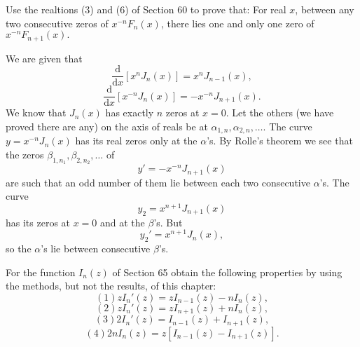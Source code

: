 \begin{problem} \label{problem13chapter6}
Use the realtions (3) and (6) of Section 60 to prove that: For real $x$, between any two consecutive zeros of $x^{-n}F_n(x)$, there lies one and only one zero of $x^{-n}F_{n+1}(x).$
\end{problem}
\begin{solution}
We are given that
$$\dfrac{\mathrm{d}}{\mathrm{d}x} \left[ x^n J_n(x) \right] = x^n J_{n-1}(x),$$
$$\dfrac{\mathrm{d}}{\mathrm{d}x} \left[ x^{-n} J_n(x) \right] = -x^{-n} J_{n+1}(x).$$
We know that $J_n(x)$ has exactly $n$ zeros at $x=0$. Let the others (we have proved there are any) on the axis of reals be at $\alpha_{1,n}, \alpha_{2,n}, \ldots.$ 
The curve $y = x^{-n}J_n(x)$ has its real zeros only at the $\alpha$'s. By Rolle's theorem we see that the zeros $\beta_{1,n_1}, \beta_{2,n_2}, \ldots$ of 
$$y' = -x^{-n}J_{n+1}(x)$$
are such that an odd number of them lie between each two consecutive $\alpha$'s. The curve
$$y_2 = x^{n+1}J_{n+1}(x)$$
has its zeros at $x=0$ and at the $\beta$'s. But
$$y_2' = x^{n+1}J_n(x),$$
so the $\alpha$'s lie between consecutive $\beta$'s.
\end{solution}
\begin{problem} \label{problem14chapter6}
For the function $I_n(z)$ of Section 65 obtain the following properties by using the methods, but not the results, of this chapter:
$$(1) zI_n'(z) = zI_{n-1}(z) - nI_n(z),$$
$$(2) zI_n'(z) = zI_{n+1}(z) + nI_n(z),$$
$$(3) 2I_n'(z) = I_{n-1}(z) + I_{n+1}(z),$$
$$(4) 2nI_n(z) = z[I_{n-1}(z)-I_{n+1}(z)].$$
\end{problem}
